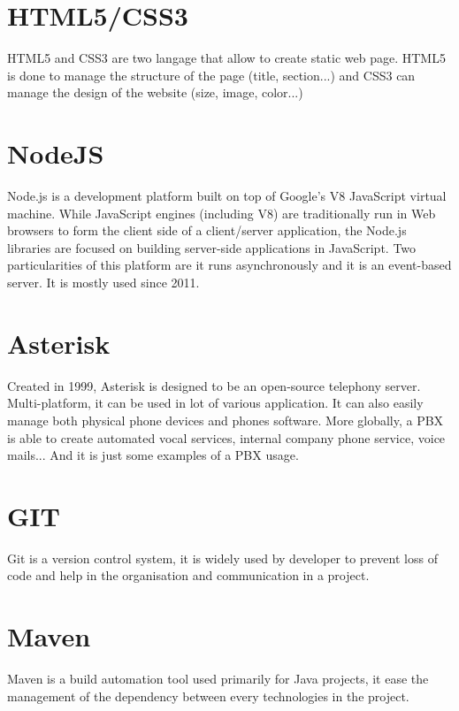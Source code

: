 \section{HTML5/CSS3}

HTML5 and CSS3 are two langage that allow to create static web page.
HTML5 is done to manage the structure of the page (title, section...) and CSS3 can manage the design of the website (size, image, color...)


\section{NodeJS}
Node.js is a development platform built on top of Google's V8 JavaScript virtual machine. While JavaScript engines (including V8) are traditionally run in Web browsers to form the client side of a client/server application, the Node.js libraries are focused on building server-side applications in JavaScript. Two particularities of this platform are it runs asynchronously and it is an event-based server. It is mostly used since 2011.


\section{Asterisk}
Created in 1999, Asterisk is designed to be an open-source telephony server. Multi-platform, it can be used in lot of various application. It can also easily manage both physical phone devices and phones software. More globally, a PBX is able to create automated vocal services, internal company phone service, voice mails... And it is just some examples of a PBX usage.


\section{GIT}

Git is a version control system, it is widely used by developer to prevent loss of code and help in the organisation and communication in a project. 


\section{Maven}

Maven is a build automation tool used primarily for Java projects, it ease the management of the dependency between every technologies in the project.


\newpage